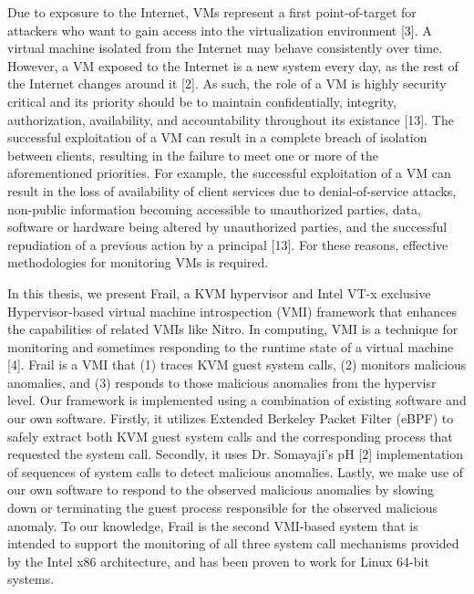 \documentclass{report}
\begin{document}
\begin{spacing}{1.5}
{\large 
Due to exposure to the Internet, VMs represent a first point-of-target for attackers who want to gain access into the virtualization environment [3]. A virtual machine isolated from the Internet may behave consistently over time. However, a VM exposed to the Internet is a new system every day, as the rest of the Internet changes around it [2]. As such, the role of a VM is highly security critical and its priority should be to maintain confidentially, integrity, authorization, availability, and accountability throughout its existance [13]. The successful exploitation of a VM can result in a complete breach of isolation between clients, resulting in the failure to meet one or more of the aforementioned priorities. For example, the successful exploitation of a VM can result in the loss of availability of client services due to denial-of-service attacks, non-public information becoming accessible to unauthorized parties, data, software or hardware being altered by unauthorized parties, and the successful repudiation of a previous action by a principal [13]. For these reasons, effective methodologies for monitoring VMs is required.
\newline
}

{\large 
In this thesis, we present Frail, a KVM hypervisor and Intel VT-x exclusive Hypervisor-based virtual machine introspection (VMI) framework that enhances the capabilities of related VMIs like Nitro. In computing, VMI is a technique for monitoring and sometimes responding to the runtime state of a virtual machine [4]. Frail is a VMI that (1) traces KVM guest system calls, (2) monitors malicious anomalies, and (3) responds to those malicious anomalies from the hypervisr level. Our framework is implemented using a combination of existing software and our own software. Firstly, it utilizes Extended Berkeley Packet Filter (eBPF) to safely extract both KVM guest system calls and the corresponding process that requested the system call. Secondly, it uses Dr. Somayaji's pH [2] implementation of sequences of system calls to detect malicious anomalies. Lastly, we make use of our own software to respond to the observed malicious anomalies by slowing down or terminating the guest process responsible for the observed malicious anomaly. To our knowledge, Frail is the second VMI-based system that is intended to support the monitoring of all three system call mechanisms provided by the Intel x86 architecture, and has been proven to work for Linux 64-bit systems.
\newline
}






\end{spacing}
\end{document}
